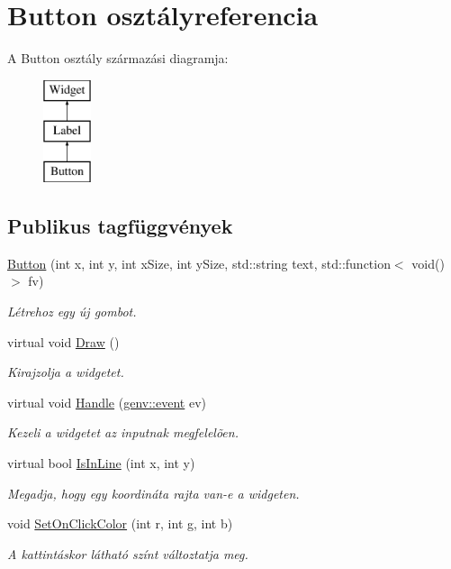 \hypertarget{class_button}{}\section{Button osztályreferencia}
\label{class_button}
A Button osztály származási diagramja\+:\begin{figure}[H]
\begin{center}
\leavevmode
\includegraphics[height=3.000000cm]{class_button}
\end{center}
\end{figure}
\subsection*{Publikus tagfüggvények}
\begin{DoxyCompactItemize}
\item 
\hyperlink{class_button_a33553572657626500239c144f1bbc04f}{Button} (int x, int y, int x\+Size, int y\+Size, std\+::string text, std\+::function$<$ void()$>$ fv)
\begin{DoxyCompactList}\small\item\em Létrehoz egy új gombot. \end{DoxyCompactList}\item 
virtual void \hyperlink{class_button_a6aaa2b781c933a296f41a8eca890eb1f}{Draw} ()
\begin{DoxyCompactList}\small\item\em Kirajzolja a widgetet. \end{DoxyCompactList}\item 
virtual void \hyperlink{class_button_a72dc68b7a78edfebe904bf489d6e03fb}{Handle} (\hyperlink{structgenv_1_1event}{genv\+::event} ev)
\begin{DoxyCompactList}\small\item\em Kezeli a widgetet az inputnak megfelelõen. \end{DoxyCompactList}\item 
virtual bool \hyperlink{class_button_a61832186fb0cf58c4c1c6fbbe572b61c}{Is\+In\+Line} (int x, int y)
\begin{DoxyCompactList}\small\item\em Megadja, hogy egy koordináta rajta van-\/e a widgeten. \end{DoxyCompactList}\item 
void \hyperlink{class_button_aa9bb1fc7a079ef575f255f9c7e4fcfbb}{Set\+On\+Click\+Color} (int r, int g, int b)
\begin{DoxyCompactList}\small\item\em A kattintáskor látható színt változtatja meg. \end{DoxyCompactList}\end{DoxyCompactItemize}
